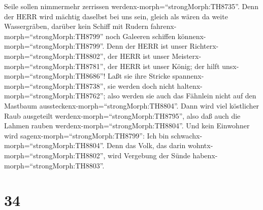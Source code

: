 Seile sollen nimmermehr zerrissen werdenx-morph=``strongMorph:TH8735''.
 Denn der HERR wird mächtig daselbst bei uns sein, gleich
als wären da weite Wassergräben, darüber kein Schiff mit Rudern
fahrenx-morph=``strongMorph:TH8799'' noch Galeeren schiffen
könnenx-morph=``strongMorph:TH8799''.  Denn der HERR ist
unser Richterx-morph=``strongMorph:TH8802'', der HERR ist unser
Meisterx-morph=``strongMorph:TH8781'', der HERR ist unser König; der
hilft unsx-morph=``strongMorph:TH8686''!  Laßt sie ihre
Stricke spannenx-morph=``strongMorph:TH8738'', sie werden doch nicht
haltenx-morph=``strongMorph:TH8762''; also werden sie auch das Fähnlein
nicht auf den Mastbaum aussteckenx-morph=``strongMorph:TH8804''. Dann
wird viel köstlicher Raub ausgeteilt
werdenx-morph=``strongMorph:TH8795'', also daß auch die Lahmen rauben
werdenx-morph=``strongMorph:TH8804''.  Und kein Einwohner
wird sagenx-morph=``strongMorph:TH8799'': Ich bin
schwachx-morph=``strongMorph:TH8804''. Denn das Volk, das darin
wohntx-morph=``strongMorph:TH8802'', wird Vergebung der Sünde
habenx-morph=``strongMorph:TH8803''.

\hypertarget{section-33}{%
\section{34}\label{section-33}}

